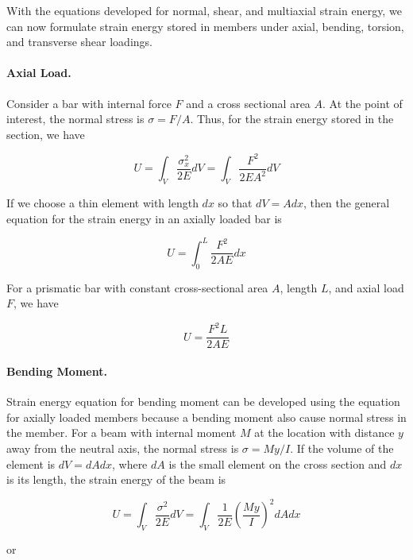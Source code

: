 \documentclass[
10pt,
a4paper,
openany,
svgnames,
]{book} %
\begin{document}
With the equations developed for normal, shear, and multiaxial strain energy, we can now formulate strain energy stored in members under axial, bending, torsion, and transverse shear loadings.

\paragraph{Axial Load.}

Consider a bar with internal force $F$ and a cross sectional area $A$. At the point of interest, the normal stress is $\sigma = F / A$. Thus, for the strain energy stored in the section, we have

\begin{equation*}
  U = \int_V \frac{\sigma_x^2}{2E} dV = \int_V \frac{F^2}{2EA^2}dV
\end{equation*}

If we choose a thin element with length $dx$ so that $dV = A dx$, then the general equation for the strain energy in an axially loaded bar is

\begin{equation}
  U = \int_0^L \frac{F^2}{2AE} dx
\end{equation}

For a prismatic bar with constant cross-sectional area $A$, length $L$, and axial load $F$, we have

\begin{equation}
  U = \frac{F^2L}{2AE}
\end{equation}

\paragraph{Bending Moment.}

Strain energy equation for bending moment can be developed using the equation for axially loaded members because a bending moment also cause normal stress in the member. For a beam with internal moment $M$ at the location with distance $y$ away from the neutral axis, the normal stress is $\sigma = My/I$. If the volume of the element is $dV = dA dx$, where $dA$ is the small element on the cross section and $dx$ is its length, the strain energy of the beam is

\begin{equation*}
  U = \int_V \frac{\sigma^2}{2E} dV = \int_V \frac{1}{2E} \left( \frac{My}{I} \right)^2 dA dx
\end{equation*}

or
\end{document}
